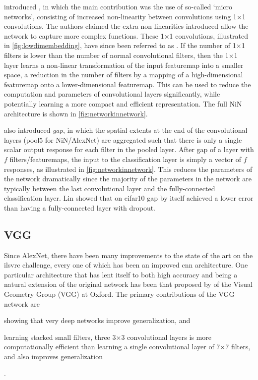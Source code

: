 \documentclass[thesis]{subfiles}
\begin{document}
\citet{Lin2013NiN} introduced , in which the main contribution was the use of so-called `micro networks', consisting of increased non-linearity between convolutions using 1$\times$1 convolutions. The authors claimed the extra non-linearities introduced allow the network to capture more complex functions. These 1$\times $1 convolutions, illustrated in \cref{fig:lowdimembedding}, have since been referred to as . If the number of 1$\times$1 filters is lower than the number of normal convolutional filters, then the 1$\times$1 layer learns a non-linear transformation of the input \gls{featuremap} into a smaller space, \ie a reduction in the number of filters by a mapping of a high-dimensional \gls{featuremap} onto a lower-dimensional \gls{featuremap}. This can be used to reduce the computation and parameters of convolutional layers significantly, while potentially learning a more compact and efficient representation. The full NiN architecture is shown in \cref{fig:networkinnetwork}.

\citet{Lin2013NiN} also introduced \emph{\gls{gap}}, in which the spatial extents at the end of the convolutional layers (\ie pool5 for NiN/AlexNet) are aggregated such that there is only a single scalar output response for each filter in the pooled layer. After \gls{gap} of a layer with $f$ filters/\glspl{featuremap}, the input to the classification layer is simply a vector of $f$ responses, as illustrated in \cref{fig:networkinnetwork}. This reduces the parameters of the network dramatically since the majority of the parameters in the network are typically between the last convolutional layer and the fully-connected classification layer. Lin \etal showed that on \gls{cifar10} \gls{gap} by itself achieved a lower error than having a fully-connected layer with dropout.

\subsection{VGG}
Since AlexNet, there have been many improvements to the state of the art on the \gls{ilsvrc} challenge, every one of which has been an improved \gls{cnn} architecture. One particular architecture that has lent itself to both high accuracy and being a natural extension of the original network has been that proposed by \citet{Simonyan2014verydeep} of the Visual Geometry Group (VGG) at Oxford. The primary contributions of the VGG network are
\begin{enumerate*}[label = (\textbf{\roman*})]
\item showing that very deep networks improve generalization, and
\item learning stacked small filters, \ie three 3$\times$3 convolutional layers is more computationally efficient than learning a single convolutional layer of 7$\times$7 filters, and also improves generalization
\end{enumerate*}.
\end{document}
